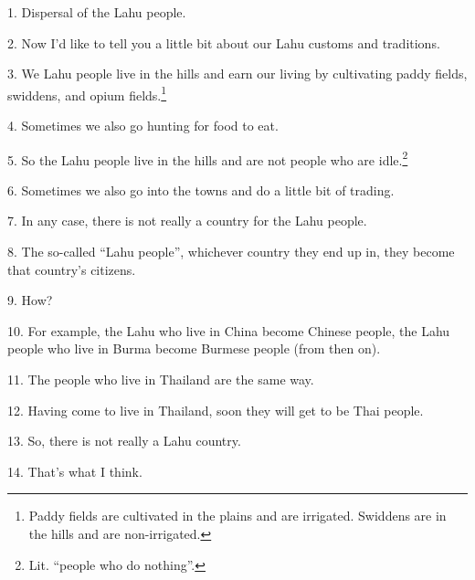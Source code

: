 \setcounter{footnote}{0}

1. Dispersal of the Lahu people.

2. Now I'd like to tell you a little bit about our Lahu customs and traditions.

3. We Lahu people live in the hills and earn our living by cultivating paddy fields, swiddens, and opium fields.\footnote{Paddy fields are cultivated in the plains and are irrigated. Swiddens are in the hills and are non-irrigated.}

4. Sometimes we also go hunting for food to eat.

5. So the Lahu people live in the hills and are not people who are idle.\footnote{Lit. ``people who do nothing''.}

6. Sometimes we also go into the towns and do a little bit of trading.

7. In any case, there is not really a country for the Lahu people.

8. The so-called ``Lahu people'', whichever country they end up in, they become that country's citizens.

9. How?

10. For example, the Lahu who live in China become Chinese people, the Lahu people
who live in Burma become Burmese people (from then on).

11. The people who live in Thailand are the same way.

12. Having come to live in Thailand, soon they will get to be Thai people.

13. So, there is not really a Lahu country.

14. That's what I think.

